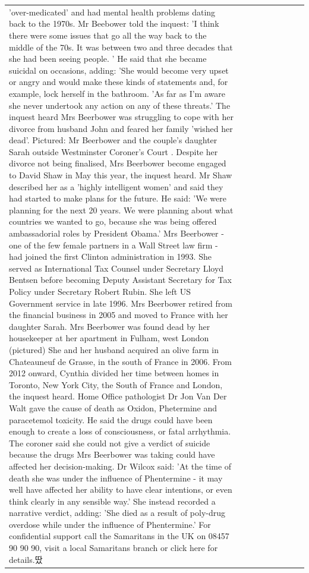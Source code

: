 \begin{table}[H]
\begin{tabular}{lllrlllll}
'over-medicated' and had mental health problems dating back to the 1970s. Mr Beebower told the inquest: 'I think there were some issues that go all the way back to the middle of the 70s. It was between two and three decades that she had been seeing people. ' He said that she became suicidal on occasions, adding: 'She would become very upset or angry and would make these kinds of statements and, for example, lock herself in the bathroom. 'As far as I'm aware she never undertook any action on any of these threats.' The inquest heard Mrs Beerbower was struggling to cope with her divorce from husband John and feared her family 'wished her dead'. Pictured: Mr Beerbower and the couple's daughter Sarah outside Westminster Coroner's Court . Despite her divorce not being finalised, Mrs Beerbower become engaged to David Shaw in May this year, the inquest heard. Mr Shaw described her as a 'highly intelligent women' and said they had started to make plans for the future. He said: 'We were planning for the next 20 years. We were planning about what countries we wanted to go, because she was being offered ambassadorial roles by President Obama.' Mrs Beerbower - one of the few female partners in a Wall Street law firm - had joined the first Clinton administration in 1993. She served as International Tax Counsel under Secretary Lloyd Bentsen before becoming Deputy Assistant Secretary for Tax Policy under Secretary Robert Rubin. She left US Government service in late 1996. Mrs Beerbower retired from the financial business in 2005 and moved to France with her daughter Sarah. Mrs Beerbower was found dead by her housekeeper at her apartment in Fulham, west London (pictured) She and her husband acquired an olive farm in Chateauneuf de Grasse, in the south of France in 2006. From 2012 onward, Cynthia divided her time between homes in Toronto, New York City, the South of France and London, the inquest heard. Home Office pathologist Dr Jon Van Der Walt gave the cause of death as Oxidon, Phetermine and paracetemol toxicity. He said the drugs could have been enough to create a loss of consciousness, or fatal arrhythmia. The coroner said she could not give a verdict of suicide because the drugs Mrs Beerbower was taking could have affected her decision-making. Dr Wilcox said: 'At the time of death she was under the influence of Phentermine - it may well have affected her ability to have clear intentions, or even think clearly in any sensible way.' She instead recorded a narrative verdict, adding: 'She died as a result of poly-drug overdose while under the influence of Phentermine.' For confidential support call the Samaritans in the UK on 08457 90 90 90, visit a local Samaritans branch or click here for details.땄 \\

\end{tabular}
\end{table}
